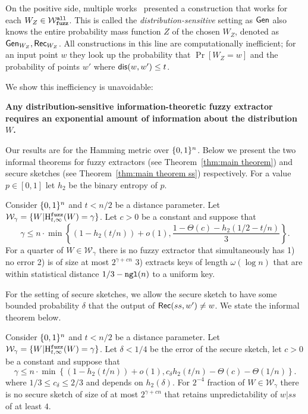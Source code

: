 On the positive side, multiple works~\cite{hayashi2014secret,hayashi2016secret,fuller2016fuzzy,woodage2017new,tyagi2017universal,TVW18,LA18,fuller2019continuous,fuller2020fuzzy} presented a construction that works for each $W_Z\in \mathcal{W}_{\mathtt{fuzz}}^{\mathtt{all}}$.  This is called the \emph{distribution-sensitive} setting as ${\mathsf{Gen}}$ also knows the entire probability mass function $Z$ of the chosen $W_Z$, denoted as ${\mathsf{Gen}}_{W_Z}, {\mathsf{Rec}}_{W_Z}$.  All constructions in this line are computationally inefficient; for an input point $w$ they look up the probability that $\Pr[W_Z=w]$ and the probability of points $w'$ where $\mathsf{dis}(w, w')\le t$.  

We show this inefficiency is unavoidable:
\begin{displayquote}
\textbf{Any distribution-sensitive information-theoretic fuzzy extractor requires an exponential amount of information about the distribution $W$.} 
\end{displayquote} 
Our results are for the Hamming metric over $\{0, 1\}^n$. Below we present the two informal theorems for fuzzy extractors (see Theorem~\ref{thm:main theorem}) and secure sketches (see Theorem~\ref{thm:main theorem ss}) respectively.  For a value $p\in [0,1]$ let $h_2$ be the binary entropy of $p$. 

\begin{theorem}
Consider $\{0, 1\}^n$ and $t< n/2$ be a distance parameter.  Let $\mathcal{W}_\gamma=\{W | \mathrm{H}^{\mathtt{fuzz}}_{t,\infty}(W) = \gamma\}$.  Let $c>0$ be a constant and suppose that \[
\gamma \le n\cdot\min\left\{(1-h_2(t/n)) +o(1), \frac{1-\Theta(c)-h_2(1/2-t/n)}{3}\right\}.
\]
 For a quarter of $W \in \mathcal{W}_\gamma$ there is no fuzzy extractor that simultaneously has 1) no error 2) is of size at most $2^{\gamma+cn}$ 3) extracts keys of length $\omega(\log n)$ that are within statistical distance $1/3-\mathtt{ngl}(n)$ to a uniform key.
\end{theorem}

For the setting of secure sketches, we allow the secure sketch to have some bounded probability $\delta$ that the output of ${\mathsf{Rec}}(ss, w') \neq w$.  We state the informal theorem below.  
\begin{theorem}
Consider $\{0, 1\}^n$ and $t< n/2$ be a distance parameter.  Let $\mathcal{W}_\gamma=\{W | \mathrm{H}^{\mathtt{fuzz}}_{t,\infty}(W) = \gamma\}$.  Let $\delta<1/4$ be the error of the secure sketch, let $c>0$ be a constant and suppose that \[
\gamma \le n\cdot\min\left\{(1-h_2(t/n)) +o(1), c_\delta h_2(t/n)-\Theta(c)-\Theta(1/n)\right\}.
\]
where $1/3\le  c_\delta \le 2/3$ and depends on $h_2(\delta)$. 
 For $2^{-4}$ fraction of $W \in \mathcal{W}_\gamma$ there is no secure sketch of
size of at most $2^{\gamma+cn}$ that
 retains unpredictability of $w|ss$ of at  least $4$.
\end{theorem}

